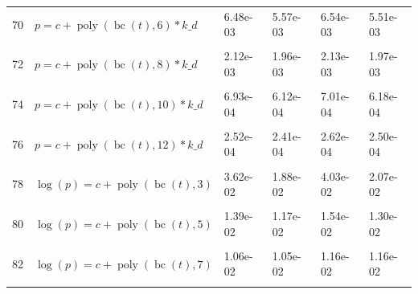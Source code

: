 \documentclass[12pt,a4paper]{article}
\DeclareMathOperator{\bc}{bc}
\DeclareMathOperator{\poly}{poly}
\begin{document}
\begin{longtable}[t]{ll>{\raggedleft\arraybackslash}p{2cm}>{\raggedleft\arraybackslash}p{2cm}>{\raggedleft\arraybackslash}p{2cm}>{\raggedleft\arraybackslash}p{2cm}}
70 & $p = c + \poly\left( \bc(t), 6 \right) * k\_d$ & 6.48e-03 & 5.57e-03 & 6.54e-03 & 5.51e-03\\
\cellcolor{gray!6}{71} & \cellcolor{gray!6}{$p = c + \poly\left( \bc(t), 7 \right) * k\_d$} & \cellcolor{gray!6}{5.34e-03} & \cellcolor{gray!6}{4.50e-03} & \cellcolor{gray!6}{4.25e-03} & \cellcolor{gray!6}{3.90e-03}\\
72 & $p = c + \poly\left( \bc(t), 8 \right) * k\_d$ & 2.12e-03 & 1.96e-03 & 2.13e-03 & 1.97e-03\\
\cellcolor{gray!6}{73} & \cellcolor{gray!6}{$p = c + \poly\left( \bc(t), 9 \right) * k\_d$} & \cellcolor{gray!6}{1.71e-03} & \cellcolor{gray!6}{1.56e-03} & \cellcolor{gray!6}{1.33e-03} & \cellcolor{gray!6}{1.27e-03}\\
74 & $p = c + \poly\left( \bc(t), 10 \right) * k\_d$ & 6.93e-04 & 6.12e-04 & 7.01e-04 & 6.18e-04\\
\cellcolor{gray!6}{75} & \cellcolor{gray!6}{$p = c + \poly\left( \bc(t), 11 \right) * k\_d$} & \cellcolor{gray!6}{5.28e-04} & \cellcolor{gray!6}{4.68e-04} & \cellcolor{gray!6}{4.19e-04} & \cellcolor{gray!6}{4.00e-04}\\
76 & $p = c + \poly\left( \bc(t), 12 \right) * k\_d$ & 2.52e-04 & 2.41e-04 & 2.62e-04 & 2.50e-04\\
\cellcolor{gray!6}{77} & \cellcolor{gray!6}{$p = c + \poly\left( \bc(t), 13 \right) * k\_d$} & \cellcolor{gray!6}{2.01e-04} & \cellcolor{gray!6}{1.93e-04} & \cellcolor{gray!6}{1.84e-04} & \cellcolor{gray!6}{1.82e-04}\\
78 & $\log(p) = c + \poly\left( \bc(t), 3 \right)$ & 3.62e-02 & 1.88e-02 & 4.03e-02 & 2.07e-02\\
\cellcolor{gray!6}{79} & \cellcolor{gray!6}{$\log(p) = c + \poly\left( \bc(t), 4 \right)$} & \cellcolor{gray!6}{2.26e-02} & \cellcolor{gray!6}{2.25e-02} & \cellcolor{gray!6}{2.51e-02} & \cellcolor{gray!6}{2.50e-02}\\
80 & $\log(p) = c + \poly\left( \bc(t), 5 \right)$ & 1.39e-02 & 1.17e-02 & 1.54e-02 & 1.30e-02\\
\cellcolor{gray!6}{81} & \cellcolor{gray!6}{$\log(p) = c + \poly\left( \bc(t), 6 \right)$} & \cellcolor{gray!6}{1.04e-02} & \cellcolor{gray!6}{1.04e-02} & \cellcolor{gray!6}{1.14e-02} & \cellcolor{gray!6}{1.14e-02}\\
82 & $\log(p) = c + \poly\left( \bc(t), 7 \right)$ & 1.06e-02 & 1.05e-02 & 1.16e-02 & 1.16e-02\\
\cellcolor{gray!6}{83} & \cellcolor{gray!6}{$\log(p) = c + \poly\left( \bc(t), 8 \right)$} & \cellcolor{gray!6}{1.04e-02} & \cellcolor{gray!6}{1.04e-02} & \cellcolor{gray!6}{1.14e-02} & \cellcolor{gray!6}{1.14e-02}\\

\end{longtable}
\end{document}
